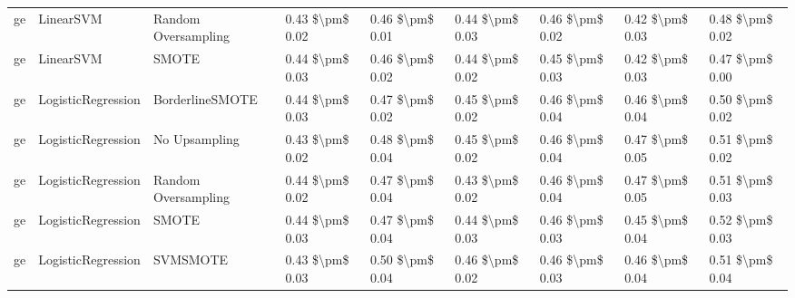 \begin{tabular}{lllllllll}
      ge &                       LinearSVM &           Random Oversampling & 0.43 \$\textbackslash pm\$ 0.02 &           0.46 \$\textbackslash pm\$ 0.01 &       0.44 \$\textbackslash pm\$ 0.03 &        0.46 \$\textbackslash pm\$ 0.02 &                         0.42 \$\textbackslash pm\$ 0.03 &     0.48 \$\textbackslash pm\$ 0.02 \\
      ge &                       LinearSVM &                         SMOTE & 0.44 \$\textbackslash pm\$ 0.03 &           0.46 \$\textbackslash pm\$ 0.02 &       0.44 \$\textbackslash pm\$ 0.02 &        0.45 \$\textbackslash pm\$ 0.03 &                         0.42 \$\textbackslash pm\$ 0.03 &     0.47 \$\textbackslash pm\$ 0.00 \\
      ge &              LogisticRegression &               BorderlineSMOTE & 0.44 \$\textbackslash pm\$ 0.03 &           0.47 \$\textbackslash pm\$ 0.02 &       0.45 \$\textbackslash pm\$ 0.02 &        0.46 \$\textbackslash pm\$ 0.04 &                         0.46 \$\textbackslash pm\$ 0.04 &     0.50 \$\textbackslash pm\$ 0.02 \\
      ge &              LogisticRegression &                 No Upsampling & 0.43 \$\textbackslash pm\$ 0.02 &           0.48 \$\textbackslash pm\$ 0.04 &       0.45 \$\textbackslash pm\$ 0.02 &        0.46 \$\textbackslash pm\$ 0.04 &                         0.47 \$\textbackslash pm\$ 0.05 &     0.51 \$\textbackslash pm\$ 0.02 \\
      ge &              LogisticRegression &           Random Oversampling & 0.44 \$\textbackslash pm\$ 0.02 &           0.47 \$\textbackslash pm\$ 0.04 &       0.43 \$\textbackslash pm\$ 0.02 &        0.46 \$\textbackslash pm\$ 0.04 &                         0.47 \$\textbackslash pm\$ 0.05 &     0.51 \$\textbackslash pm\$ 0.03 \\
      ge &              LogisticRegression &                         SMOTE & 0.44 \$\textbackslash pm\$ 0.03 &           0.47 \$\textbackslash pm\$ 0.04 &       0.44 \$\textbackslash pm\$ 0.03 &        0.46 \$\textbackslash pm\$ 0.03 &                         0.45 \$\textbackslash pm\$ 0.04 &     0.52 \$\textbackslash pm\$ 0.03 \\
      ge &              LogisticRegression &                      SVMSMOTE & 0.43 \$\textbackslash pm\$ 0.03 &           0.50 \$\textbackslash pm\$ 0.04 &       0.46 \$\textbackslash pm\$ 0.02 &        0.46 \$\textbackslash pm\$ 0.03 &                         0.46 \$\textbackslash pm\$ 0.04 &     0.51 \$\textbackslash pm\$ 0.04 \\

\end{tabular}
